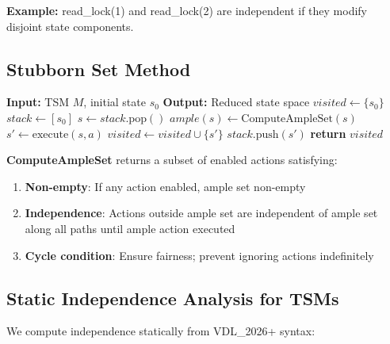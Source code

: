 \documentclass[conference]{IEEEtran}
\begin{document}
\textbf{Example:} read\_lock(1) and read\_lock(2) are independent if they modify disjoint state components.

\subsection{Stubborn Set Method}

\begin{algorithm}
\caption{Partial Order Reduction (Stubborn Sets)}
\label{alg:por}
\begin{algorithmic}
\STATE \textbf{Input:} TSM $M$, initial state $s_0$
\STATE \textbf{Output:} Reduced state space
\STATE
\STATE $visited \gets \{s_0\}$
\STATE $stack \gets [s_0]$
  \STATE $s \gets stack.\text{pop}()$
  \STATE $ample(s) \gets \text{ComputeAmpleSet}(s)$ 
    \STATE $s' \gets \text{execute}(s, a)$
      \STATE $visited \gets visited \cup \{s'\}$
      \STATE $stack.\text{push}(s')$
    \ENDIF
  \ENDFOR
\ENDWHILE
\STATE \textbf{return} $visited$
\end{algorithmic}
\end{algorithm}

\textbf{ComputeAmpleSet} returns a subset of enabled actions satisfying:
\begin{enumerate}
\item \textbf{Non-empty}: If any action enabled, ample set non-empty
\item \textbf{Independence}: Actions outside ample set are independent of ample set along all paths until ample action executed
\item \textbf{Cycle condition}: Ensure fairness; prevent ignoring actions indefinitely
\end{enumerate}

\subsection{Static Independence Analysis for TSMs}

We compute independence statically from VDL\_2026+ syntax:
\end{document}
